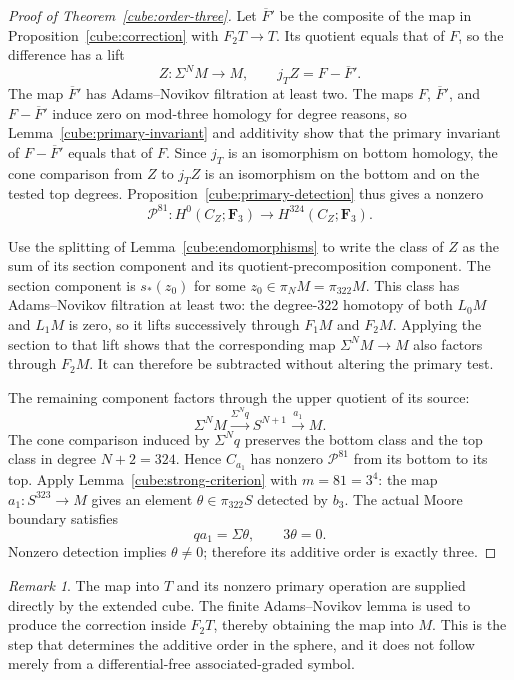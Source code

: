\documentclass[11pt]{article}
\theoremstyle{definition}
\theoremstyle{remark}
\newtheorem{remark}[theorem]{Remark}
\numberwithin{equation}{section}
\begin{document}
\begin{proof}[Proof of Theorem~\ref{cube:order-three}]
Let \(\overline F'\) be the composite of the map in
Proposition~\ref{cube:correction} with \(F_2T\to T\).
Its quotient equals that of \(F\), so the difference
has a lift
\[
 Z:\Sigma^NM\longrightarrow M,\qquad
 j_TZ=F-\overline F'.
\]
The map \(\overline F'\) has Adams--Novikov filtration
at least two.  The maps \(F\), \(\overline F'\), and
\(F-\overline F'\) induce zero on mod-three homology for degree reasons, so
Lemma~\ref{cube:primary-invariant} and additivity
show that the primary invariant of
\(F-\overline F'\) equals that of \(F\).
Since \(j_T\) is an isomorphism on bottom homology,
the cone comparison from \(Z\) to \(j_TZ\) is an
isomorphism on the bottom and on the tested top
degrees.  Proposition~\ref{cube:primary-detection}
thus gives a nonzero
\[
 \mathcal P^{81}:H^0(C_Z;\mathbf F_3)\longrightarrow
                      H^{324}(C_Z;\mathbf F_3).
\]

Use the splitting of Lemma~\ref{cube:endomorphisms}
to write the class of \(Z\) as the sum of its
section component and its quotient-precomposition
component.  The section component is \(s_*(z_0)\)
for some \(z_0\in\pi_NM=\pi_{322}M\).
This class has Adams--Novikov filtration at
least two: the degree-322 homotopy of both
\(L_0M\) and \(L_1M\) is zero, so it lifts
successively through \(F_1M\) and \(F_2M\).
Applying the section to that lift shows that
the corresponding map \(\Sigma^NM\to M\)
also factors through \(F_2M\).
It can therefore be subtracted without
altering the primary test.

The remaining component factors through the
upper quotient of its source:
\[
 \Sigma^NM\xrightarrow{\Sigma^Nq}S^{N+1}
       \xrightarrow{a_1}M.
\]
The cone comparison induced by \(\Sigma^Nq\)
preserves the bottom class and the top class
in degree \(N+2=324\).  Hence \(C_{a_1}\)
has nonzero \(\mathcal P^{81}\) from its
bottom to its top.  Apply
Lemma~\ref{cube:strong-criterion} with
\(m=81=3^4\): the map
\(a_1:S^{323}\to M\) gives an element
\(\theta\in\pi_{322}S\) detected by \(b_3\).
The actual Moore boundary satisfies
\[
 qa_1=\Sigma\theta,\qquad 3\theta=0.
\]
Nonzero detection implies \(\theta\ne0\);
therefore its additive order is exactly three.
\end{proof}

\begin{remark}
The map into \(T\) and its nonzero primary operation
are supplied directly by the extended cube.
The finite Adams--Novikov lemma is used to produce
the correction inside \(F_2T\), thereby obtaining
the map into \(M\).  This is the step that determines
the additive order in the sphere, and it does not
follow merely from a differential-free
associated-graded symbol.
\end{remark}
\end{document}
